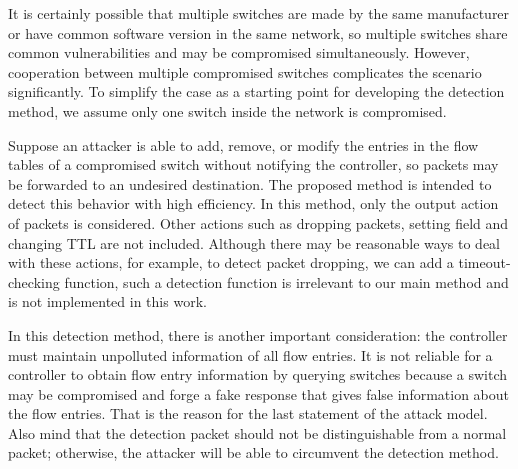 It is certainly possible that multiple switches are made by the same manufacturer or have common software version in the same network, so multiple switches share common vulnerabilities and may be compromised simultaneously. However, cooperation between multiple compromised switches complicates the scenario significantly. To simplify the case as a starting point for developing the detection method, we assume only one switch inside the network is compromised.

Suppose an attacker is able to add, remove, or modify the entries in the flow tables of a compromised switch without notifying the controller, so packets may be forwarded to an undesired destination. The proposed method is intended to detect this behavior with high efficiency. In this method, only the output action of packets is considered. Other actions such as dropping packets, setting field and changing TTL are not included. Although there may be reasonable ways to deal with these actions, for example, to detect packet dropping, we can add a timeout-checking function, such a detection function is irrelevant to our main method and is not implemented in this work.

In this detection method, there is another important consideration: the controller must maintain unpolluted information of all flow entries. It is not reliable for a controller to obtain flow entry information by querying switches because a switch may be compromised and forge a fake response that gives false information about the flow entries. That is the reason for the last statement of the attack model. Also mind that the detection packet should not be distinguishable from a normal packet; otherwise, the attacker will be able to circumvent the detection method.